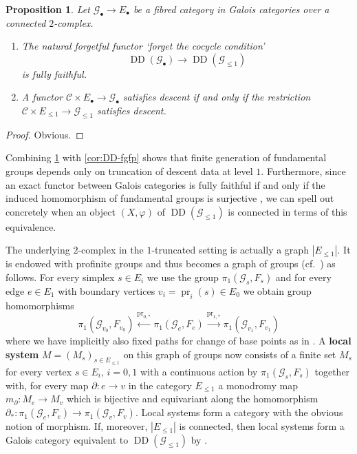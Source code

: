 \documentclass[a4paper,twoside,11pt,reqno]{amsart}
\newcommand{\cC}{{\mathcal C}}
\newcommand{\cG}{{\mathcal G}}
\newcommand{\la}{\longrightarrow}
\DeclareMathOperator{\pr}{pr}
\newcommand{\ph}{\varphi}
\DeclareMathOperator{\Desc}{DD}
\newtheorem{prop}[thm]{Proposition}
\theoremstyle{definition}
\numberwithin{equation}{subsection}
\begin{document}
\begin{prop}
\label{prop:truncated DD}
    Let $\cG_\bullet \to E_\bullet$ be a fibred category in Galois categories over a connected $2$-complex.
    \begin{enumerate}
        \item 
        The natural forgetful functor `forget the cocycle condition'
        \[
        \Desc(\cG_\bullet) \la \Desc(\cG_{\leq 1})
        \]
        is fully faithful.
        \item
        A functor $\cC \times E_\bullet \to \cG_\bullet$ satisfies descent if and only if the restriction $\cC \times E_{\leq 1} \to \cG_{\leq 1}$ satisfies descent.
    \end{enumerate}
\end{prop}
\begin{proof}
    Obvious.
\end{proof}

Combining \cref{prop:truncated DD} with \cref{cor:DD-fgfp} shows that finite generation of fundamental groups depends only on truncation of descent data at level $1$. Furthermore, since an exact functor between Galois categories is fully faithful if and only if the induced homomorphism of fundamental groups is surjective \cite[V Proposition~6.9]{SGA1}, we can spell out concretely when an object $(X,\ph)$ of $\Desc(\cG_{\leq 1})$ is connected in terms of this equivalence. 

The underlying $2$-complex in the $1$-truncated setting is actually a graph $|E_{\leq 1}|$. It is endowed with profinite groups and thus becomes a graph of groups (cf.\ \cite[I.4.4 Definition 8]{Serre:trees}) as follows. For every simplex $s \in E_i$ we use the group $\pi_1(\cG_s,F_s)$ and for every edge $e \in E_1$ with boundary vertices $v_i = \pr_i(s) \in E_0$ we obtain group homomorphisms
\[
\pi_1(\cG_{v_0},F_{v_0}) \xleftarrow{\pr_{0,\ast}} 
\pi_1(\cG_e,F_e)
\xrightarrow{\pr_{1,\ast}} \pi_1(\cG_{v_1},F_{v_1}) 
\]
where we have implicitly also fixed paths for change of base points as in . A \textbf{local system} $M = (M_s)_{s \in E_{\leq 1}}$ on this graph of groups now consists of a finite set $M_s$ for every vertex $s \in E_i$, $i=0,1$ with a continuous action by $\pi_1(\cG_s,F_s)$ together with, for every map $\partial \colon e \to v$ in the category $E_{\leq 1}$ a monodromy map $m_{\partial} \colon M_e \to M_v$ which is bijective and equivariant along the homomorphism $\partial_\ast \colon \pi_1(\cG_e,F_e) \to \pi_1(\cG_v,F_v)$. Local systems form a category with the obvious notion of morphism. If, moreover, $|E_{\leq 1}|$ is connected, then local systems form a Galois category equivalent to $\Desc(\cG_{\leq 1})$ by \cite[Proposition~4.4]{Stix2006:vanKampen}. 
\end{document}
